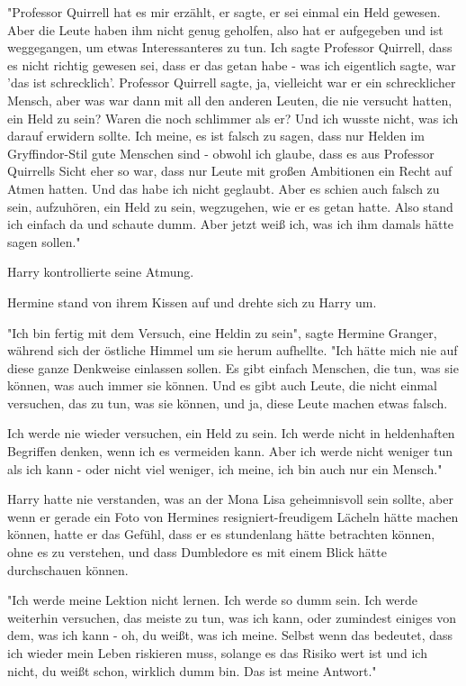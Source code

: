 {"Professor Quirrell hat es mir erzählt, er sagte, er sei einmal ein Held gewesen. Aber die Leute haben ihm nicht genug geholfen, also hat er aufgegeben und ist weggegangen, um etwas Interessanteres zu tun. Ich sagte Professor Quirrell, dass es nicht richtig gewesen sei, dass er das getan habe - was ich eigentlich sagte, war 'das ist schrecklich'. Professor Quirrell sagte, ja, vielleicht war er ein schrecklicher Mensch, aber was war dann mit all den anderen Leuten, die nie versucht hatten, ein Held zu sein? Waren die noch schlimmer als er? Und ich wusste nicht, was ich darauf erwidern sollte. Ich meine, es ist falsch zu sagen, dass nur Helden im Gryffindor-Stil gute Menschen sind - obwohl ich glaube, dass es aus Professor Quirrells Sicht eher so war, dass nur Leute mit großen Ambitionen ein Recht auf Atmen hatten. Und das habe ich nicht geglaubt. Aber es schien auch falsch zu sein, aufzuhören, ein Held zu sein, wegzugehen, wie er es getan hatte. Also stand ich einfach da und schaute dumm. Aber jetzt weiß ich, was ich ihm damals hätte sagen sollen."

Harry kontrollierte seine Atmung.

Hermine stand von ihrem Kissen auf und drehte sich zu Harry um.

"Ich bin fertig mit dem Versuch, eine Heldin zu sein", sagte Hermine Granger, während sich der östliche Himmel um sie herum aufhellte. "Ich hätte mich nie auf diese ganze Denkweise einlassen sollen. Es gibt einfach Menschen, die tun, was sie können, was auch immer sie können. Und es gibt auch Leute, die nicht einmal versuchen, das zu tun, was sie können, und ja, diese Leute machen etwas falsch.

Ich werde nie wieder versuchen, ein Held zu sein. Ich werde nicht in heldenhaften Begriffen denken, wenn ich es vermeiden kann. Aber ich werde nicht weniger tun als ich kann - oder nicht viel weniger, ich meine, ich bin auch nur ein Mensch."

Harry hatte nie verstanden, was an der Mona Lisa geheimnisvoll sein sollte, aber wenn er gerade ein Foto von Hermines resigniert-freudigem Lächeln hätte machen können, hatte er das Gefühl, dass er es stundenlang hätte betrachten können, ohne es zu verstehen, und dass Dumbledore es mit einem Blick hätte durchschauen können.

"Ich werde meine Lektion nicht lernen. Ich werde so dumm sein. Ich werde weiterhin versuchen, das meiste zu tun, was ich kann, oder zumindest einiges von dem, was ich kann - oh, du weißt, was ich meine. Selbst wenn das bedeutet, dass ich wieder mein Leben riskieren muss, solange es das Risiko wert ist und ich nicht, du weißt schon, wirklich dumm bin. Das ist meine Antwort."

}
